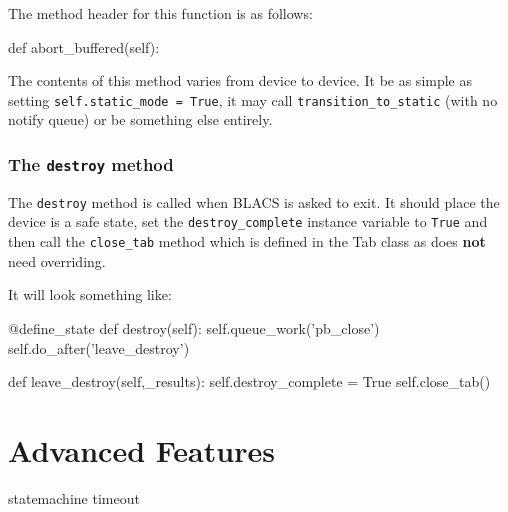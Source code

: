 \documentclass[12pt]{article}
\begin{document}
The method header for this function is as follows:
\begin{python}
    def abort_buffered(self):
\end{python}

The contents of this method varies from device to device. It be as simple as setting \texttt{self.static\_mode = True}, it may call \texttt{transition\_to\_static} (with no notify queue) or be something else entirely.

\subsubsection{The \texttt{destroy} method}\label{device_class_destroy}
The \texttt{destroy} method is called when BLACS is asked to exit. It should place the device is a safe state, set the \texttt{destroy\_complete} instance variable to \texttt{True} and then call the \texttt{close\_tab} method which is defined in the Tab class as does \textbf{not} need overriding. 

It will look something like:
\begin{python}
    @define_state
    def destroy(self):        
        self.queue_work('pb_close')
        self.do_after('leave_destroy')
        
    def leave_destroy(self,_results):
        self.destroy_complete = True
        self.close_tab()
\end{python}

\section{Advanced Features}

statemachine timeout
\end{document}

